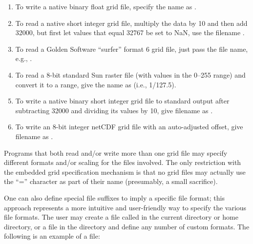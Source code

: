 \begin{enumerate}
\item To write a native binary float grid file, specify the name as .

\item To read a native short integer grid file, multiply the data by 10 and then
add 32000, but first let values that equal 32767 be set to NaN,
use the filename .

\item To read a Golden Software ``surfer'' format 6 grid file, just pass the file name,
e.g., .

\item To read a 8-bit standard Sun raster file (with values in the 0--255 range)
and convert it to a  range, give the name as
 (i.e., 1/127.5).

\item To write a native binary short integer grid file to standard output after subtracting
32000 and dividing its values by 10, give filename as .

\item To write an 8-bit integer netCDF grid file with an
  auto-adjusted offset, give filename as .

\end{enumerate}

Programs that both read and/or write more than one grid file may
specify different formats and/or scaling for the files involved.
The only restriction with the embedded grid specification mechanism
is that no grid files may actually use the ``=''
character as part of their name (presumably, a small sacrifice).


One can also define special file suffixes to imply a specific file
format; this approach represents a more intuitive and
user-friendly way to specify the various file formats.  The user
may create a file called  in the current
directory or home directory, or a file  in the
directory  and define any number of custom
formats.  The following is an example of a 
file: 

